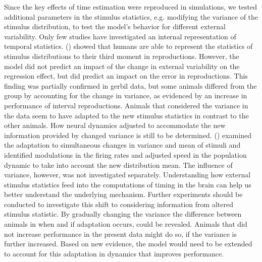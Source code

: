 \documentclass[10pt]{article}
\begin{document}
Since the key effects of time estimation were reproduced in simulations, we tested additional parameters in the stimulus statistics, e.g. modifying the variance of the stimulus distribution, to test the model's behavior for different external variability.
Only few studies have investigated an internal representation of temporal statistics. \citeauthor{Acerbi2012} (\citeyear{Acerbi2012}) showed that humans are able to represent the statistics of stimulus distributions to their third moment in reproductions.  
However, the model did not predict an impact of the change in external variability on the regression effect, but did predict an impact on the error in reproductions.
This finding was partially confirmed in gerbil data, but some animals differed from the group by accounting for the change in variance, as evidenced by an increase in performance of interval reproductions.
Animals that considered the variance in the data seem to have adapted to the new stimulus statistics in contrast to the other animals. 
How neural dynamics adjusted to accommodate the new information provided by changed variance is still to be determined.
\citeauthor{Meirhaeghe2021} (\citeyear{Meirhaeghe2021}) examined the adaptation to simultaneous changes in variance and mean of stimuli and identified modulations in the firing rates and adjusted speed in the population dynamic to take into account the new distribution mean. The influence of variance, however, was not investigated separately. 
Understanding how external stimulus statistics feed into the computations of timing in the brain can help us better understand the underlying mechanism. 
Further experiments should be conducted to investigate this shift to considering information from altered stimulus statistic. 
By gradually changing the variance the difference between animals in when and if adaptation occurs, could be revealed. 
Animals that did not increase performance in the present data might do so, if the variance is further increased.
Based on new evidence, the model would need to be extended to account for this adaptation in dynamics that improves performance.
\end{document}
